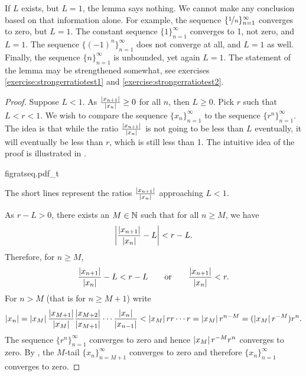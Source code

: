 If $L$ exists, but $L=1$, the lemma says nothing.  We cannot make any
conclusion based on that information alone.  For example,
the sequence $\{ \nicefrac{1}{n} \}_{n=1}^\infty$ converges to zero, but $L=1$.
The constant sequence $\{ 1 \}_{n=1}^\infty$ converges to 1, not zero, and 
$L=1$.  The sequence $\bigl\{ {(-1)}^n \bigr\}_{n=1}^\infty$ does not converge at all, and $L=1$ as
well.
Finally, the sequence $\{  n \}_{n=1}^\infty$ is unbounded, yet again $L=1$.
The statement of the lemma may be strengthened somewhat, see 
exercises \ref{exercise:strongerratiotest1} and
\ref{exercise:strongerratiotest2}.

\begin{proof}
Suppose $L < 1$.
As
$\frac{\left\lvert {x_{n+1}} \right\rvert}{\left\lvert {x_n} \right\rvert} \geq 0$ for all $n$, then $L \geq 0$.  Pick
$r$ such that $L < r < 1$.
We wish to compare the sequence $\{ x_n \}_{n=1}^\infty$ to the sequence $\{ r^n \}_{n=1}^\infty$.  The idea is that
while the ratio $\frac{\left\lvert {x_{n+1}} \right\rvert}{\left\lvert {x_n} \right\rvert}$ is not going to be less than $L$ eventually,
it will eventually be less than $r$, which is still less than 1.
The intuitive idea of the proof is illustrated in .
\begin{myfigureht}
{figratseq.pdf_t}
\caption{The short lines represent the ratios 
$\frac{\left\lvert {x_{n+1}} \right\rvert}{\left\lvert {x_n} \right\rvert}$
approaching $L < 1$.\label{figratseq}}
\end{myfigureht}

As $r-L > 0$, there exists an $M \in {\mathbb{N}}$ such that for
all $n \geq M$, we have
\begin{equation*}
\left\lvert {\frac{\left\lvert {x_{n+1}} \right\rvert}{\left\lvert {x_n} \right\rvert} - L} \right\rvert < r-L .
\end{equation*}
Therefore, for $n \geq M$,
\begin{equation*}
\frac{\left\lvert {x_{n+1}} \right\rvert}{\left\lvert {x_n} \right\rvert} - L < r-L 
\qquad \text{or} \qquad
\frac{\left\lvert {x_{n+1}} \right\rvert}{\left\lvert {x_n} \right\rvert} < r .
\end{equation*}
For $n > M$ (that is for $n \geq M+1$)
write
\begin{equation*}
\left\lvert {x_n} \right\rvert =
\left\lvert {x_M} \right\rvert
\frac{\left\lvert {x_{M+1}} \right\rvert}{\left\lvert {x_{M}} \right\rvert}
\frac{\left\lvert {x_{M+2}} \right\rvert}{\left\lvert {x_{M+1}} \right\rvert}
\cdots
\frac{\left\lvert {x_{n}} \right\rvert}{\left\lvert {x_{n-1}} \right\rvert}
<
\left\lvert {x_M} \right\rvert
r r \cdots r = \left\lvert {x_M} \right\rvert r^{n-M} = (\left\lvert {x_M} \right\rvert r^{-M}) r^n .
\end{equation*}
The sequence $\{ r^n \}_{n=1}^\infty$ converges to zero and hence 
$\left\lvert {x_M} \right\rvert r^{-M} r^n$ converges to zero.  By ,
the $M$-tail
$\{x_n\}_{n=M+1}^\infty$ converges to zero and therefore $\{x_n\}_{n=1}^\infty$ converges to zero.


\end{proof}
